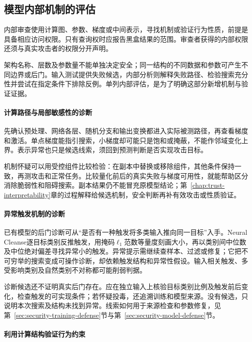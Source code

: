 \subsection{模型内部机制的评估}
\label{sec:security-model-test}

内部审查使用计算图、参数、梯度或中间表示，寻找机制或验证行为性质，前提是具备相应访问权限。只有查询权时应报告黑盒结果的范围。审查者获得的内部权限还须与真实攻击者的权限分开声明。

架构名称、层数及参数量不能单独决定安全；同一结构的不同数据和参数可产生不同边界或后门。输入测试提供失败候选，内部分析则解释失败路径、检验搜索充分性并尝试在指定条件下排除反例。单列内部评估，是为了明确这部分新增机制与验证证据。

\paragraph{计算路径与局部敏感性的诊断}

先确认预处理、网络各层、随机分支和输出变换都进入实际被测路径，再查看梯度和激活。单点梯度能指引搜索，小梯度却可能只是饱和或掩蔽，不能作邻域变化上界。表示异常也只是候选线索，须回到预测判断是否实现攻击目标。

机制怀疑可以用受控组件比较检验：在副本中替换或移除组件，其他条件保持一致，再测攻击和正常任务。比较量化前后的真实失败与梯度可用性，就能帮助区分消除脆弱性和阻碍搜索。副本结果仍不能冒充原模型结论；第~\ref{chap:trust-interpretability}章的过程解释给候选机制，安全判断再补有效攻击或性质验证。

\paragraph{异常触发机制的诊断}

已有模型的后门诊断可从“是否有一种触发将多类输入推向同一目标”入手。Neural Cleanse逐目标类别反推触发，用掩码$\ell_1$范数等量度刻画大小，再以类别间中位数及中位绝对偏差寻找异常小的触发。异常提示需继续查样本、过滤或修复；它把不可穷举的搜索变成可操作诊断，却依赖触发结构和异常性假设。输入相关触发、多受影响类别及自然类别不对称都可能削弱判据。

诊断候选还不证明真实后门存在。应在独立输入上核验目标类别比例及触发前后变化，检查触发的可实现条件；若怀疑投毒，还追溯训练和模型来源。没有候选，只说明本次搜索及结构未找到异常。线索如何用于来源检查和参数修复，见第~\ref{sec:security-training-defense}节与第~\ref{sec:security-model-defense}节。

\paragraph{利用计算结构验证行为约束}

